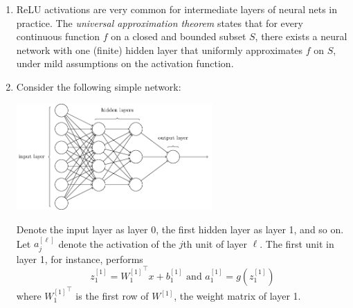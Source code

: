 \documentclass[10pt]{article}
\begin{document}
\begin{multicols}{2}
\begin{addmargin}[0.8em]{0.5em}
\begin{enumerate}[label=(\alph*)]
        \item ReLU activations are very common for intermediate layers of neural nets in practice. The \textit{universal approximation theorem} states that for every continuous function $f$ on a closed and bounded subset $S$, there exists a neural network with one (finite) hidden layer that uniformly approximates $f$ on $S$, under mild assumptions on the activation function.
        \columnbreak
        
        \item Consider the following simple network:
        \begin{center}
            \includegraphics[width=7.5cm]{nn.png}
        \end{center}
        Denote the input layer as layer 0, the first hidden layer as layer 1, and so on. Let $a_j^{[\ell]}$ denote the activation of the $j$th unit of layer $\ell$. The first unit in layer 1, for instance, performs 
        $$z_1^{[1]} = {W_1^{[1]}}^\top x + b_1^{[1]} \text{ and } a_1^{[1]} = g(z_1^{[1]})$$ 
        where ${W_1^{[1]}}^\top$ is the first row of $W^{[1]}$, the weight matrix of layer 1.
        

\end{enumerate}
\end{addmargin}
\end{multicols}
\end{document}
